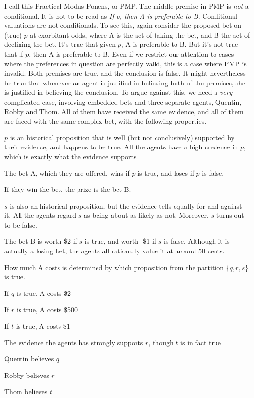 \noindent I call this Practical Modus Ponens, or PMP. The middle premise in PMP is \textit{not} a conditional. It is not to be read as \textit{If p, then A is preferable to B}. Conditional valuations are not conditionals. To see this, again consider the proposed bet on (true) \(p\) at exorbitant odds, where A is the act of taking the bet, and B the act of declining the bet. It's true that given \(p\), A is preferable to B. But it's not true that if \(p\), then A is preferable to B. Even if we restrict our attention to cases where the preferences in question are perfectly valid, this is a case where PMP is invalid. Both premises are true, and the conclusion is false. It might nevertheless be true that whenever an agent is justified in believing both of the premises, she is justified in believing the conclusion. To argue against this, we need a \textit{very} complicated case, involving embedded bets and three separate agents, Quentin, Robby and Thom. All of them have received the same evidence, and all of them are faced with the same complex bet, with the following properties.

\begin{itemize*}
\item \(p\) is an historical proposition that is well (but not conclusively) supported by their evidence, and happens to be true. All the agents have a high credence in \(p\), which is exactly what the evidence supports.
\item The bet A, which they are offered, wins if \(p\) is true, and loses if \(p\) is false.
\item If they win the bet, the prize is the bet B.
\item \(s\) is also an historical proposition, but the evidence tells equally for and against it. All the agents regard \(s\) as being about as likely as not. Moreover, \(s\) turns out to be false.
\item The bet B is worth \$2 if \(s\) is true, and worth -\$1 if \(s\) is false. Although it is actually a losing bet, the agents all rationally value it at around 50 cents.
\item How much A costs is determined by which proposition from the partition \{\(q, r, s\)\} is true.
\item If \(q\) is true, A costs \$2
\item If \(r\) is true, A costs \$500
\item If \(t\) is true, A costs \$1
\item The evidence the agents has strongly supports \(r\), though \(t\) is in fact true
\item Quentin believes \(q\)
\item Robby believes \(r\)
\item Thom believes \(t\)
\end{itemize*}

